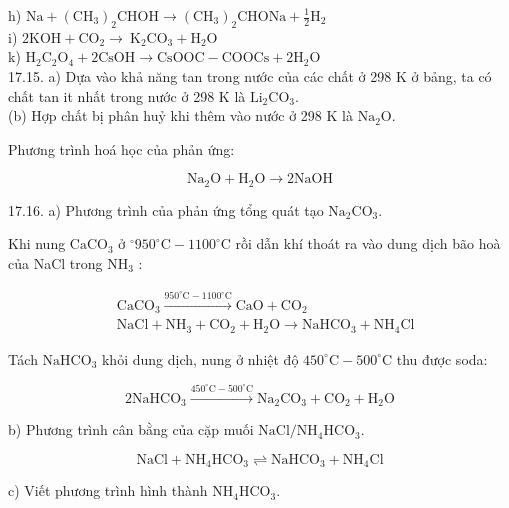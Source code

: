 \documentclass[10pt]{article}
\begin{document}
\begin{itemize}
h) $\mathrm{Na}+\left(\mathrm{CH}_{3}\right)_{2} \mathrm{CHOH} \rightarrow\left(\mathrm{CH}_{3}\right)_{2} \mathrm{CHONa}+\frac{1}{2} \mathrm{H}_{2}$\\
i) $2 \mathrm{KOH}+\mathrm{CO}_{2} \rightarrow \mathrm{~K}_{2} \mathrm{CO}_{3}+\mathrm{H}_{2} \mathrm{O}$\\
k) $\mathrm{H}_{2} \mathrm{C}_{2} \mathrm{O}_{4}+2 \mathrm{CsOH} \rightarrow \mathrm{CsOOC}-\mathrm{COOCs}+2 \mathrm{H}_{2} \mathrm{O}$\\
17.15. a) Dựa vào khả năng tan trong nước của các chất ở 298 K ở bảng, ta có chất tan it nhất trong nước ở 298 K là $\mathrm{Li}_{2} \mathrm{CO}_{3}$.\\
(b) Hợp chất bị phân huỷ khi thêm vào nước ở 298 K là $\mathrm{Na}_{2} \mathrm{O}$.
\end{itemize}

Phương trình hoá học của phản ứng:

$$
\mathrm{Na}_{2} \mathrm{O}+\mathrm{H}_{2} \mathrm{O} \rightarrow 2 \mathrm{NaOH}
$$

17.16. a) Phương trình của phản ứng tổng quát tạo $\mathrm{Na}_{2} \mathrm{CO}_{3}$.

Khi nung $\mathrm{CaCO}_{3}$ ở $^{\circ} 950^{\circ} \mathrm{C}-1100^{\circ} \mathrm{C}$ rồi dẫn khí thoát ra vào dung dịch bão hoà của NaCl trong $\mathrm{NH}_{3}$ :

$$
\begin{aligned}
& \mathrm{CaCO}_{3} \xrightarrow{950^{\circ} \mathrm{C}-1100^{\circ} \mathrm{C}} \mathrm{CaO}+\mathrm{CO}_{2} \\
& \mathrm{NaCl}+\mathrm{NH}_{3}+\mathrm{CO}_{2}+\mathrm{H}_{2} \mathrm{O} \rightarrow \mathrm{NaHCO}_{3}+\mathrm{NH}_{4} \mathrm{Cl}
\end{aligned}
$$

Tách $\mathrm{NaHCO}_{3}$ khỏi dung dịch, nung ở nhiệt độ $450^{\circ} \mathrm{C}-500^{\circ} \mathrm{C}$ thu được soda:

$$
2 \mathrm{NaHCO}_{3} \xrightarrow{450^{\circ} \mathrm{C}-500^{\circ} \mathrm{C}} \mathrm{Na}_{2} \mathrm{CO}_{3}+\mathrm{CO}_{2}+\mathrm{H}_{2} \mathrm{O}
$$

b) Phương trình cân bằng của cặp muối $\mathrm{NaCl} / \mathrm{NH}_{4} \mathrm{HCO}_{3}$.

$$
\mathrm{NaCl}+\mathrm{NH}_{4} \mathrm{HCO}_{3} \rightleftharpoons \mathrm{NaHCO}_{3}+\mathrm{NH}_{4} \mathrm{Cl}
$$

c) Viết phương trình hình thành $\mathrm{NH}_{4} \mathrm{HCO}_{3}$.
\end{document}

